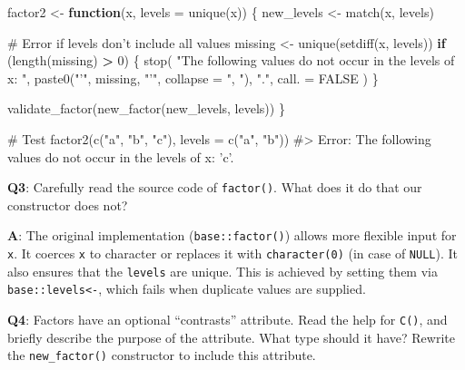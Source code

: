 \documentclass[
]{krantz}
\makeatletter
\newenvironment{Shaded}{\begin{snugshade}}{\end{snugshade}}
\newcommand{\CommentTok}[1]{\textcolor[rgb]{0.56,0.35,0.01}{\textit{#1}}}
\newcommand{\ControlFlowTok}[1]{\textcolor[rgb]{0.13,0.29,0.53}{\textbf{#1}}}
\newcommand{\DataTypeTok}[1]{\textcolor[rgb]{0.13,0.29,0.53}{#1}}
\newcommand{\DecValTok}[1]{\textcolor[rgb]{0.00,0.00,0.81}{#1}}
\newcommand{\KeywordTok}[1]{\textcolor[rgb]{0.13,0.29,0.53}{\textbf{#1}}}
\newcommand{\NormalTok}[1]{#1}
\newcommand{\OperatorTok}[1]{\textcolor[rgb]{0.81,0.36,0.00}{\textbf{#1}}}
\newcommand{\OtherTok}[1]{\textcolor[rgb]{0.56,0.35,0.01}{#1}}
\newcommand{\StringTok}[1]{\textcolor[rgb]{0.31,0.60,0.02}{#1}}
\newenvironment{kframe}{%
\medskip{}
\setlength{\fboxsep}{.8em}
 \def\at@end@of@kframe{}%
 \ifinner\ifhmode%
  \def\at@end@of@kframe{\end{minipage}}%
  \begin{minipage}{\columnwidth}%
 \fi\fi%
 \def\FrameCommand##1{\hskip\@totalleftmargin \hskip-\fboxsep
 \colorbox{shadecolor}{##1}\hskip-\fboxsep
     \hskip-\linewidth \hskip-\@totalleftmargin \hskip\columnwidth}%
 \MakeFramed {\advance\hsize-\width
   \@totalleftmargin\z@ \linewidth\hsize
   \@setminipage}}%
 {\par\unskip\endMakeFramed%
 \at@end@of@kframe}
\renewenvironment{Shaded}{\begin{kframe}}{\end{kframe}}
\renewcommand{\KeywordTok} [1]{\textcolor[rgb]{0.00,0.44,0.13}{{#1}}}
\renewcommand{\DataTypeTok}[1]{\textcolor[rgb]{0.56,0.13,0.00}{{#1}}}
\renewcommand{\DecValTok}  [1]{\textcolor[rgb]{0.25,0.63,0.44}{{#1}}}
\renewcommand{\StringTok}  [1]{\textcolor[rgb]{0.25,0.44,0.63}{{#1}}}
\renewcommand{\CommentTok} [1]{\textcolor[rgb]{0.38,0.63,0.69}{{#1}}}
\renewcommand{\OtherTok}   [1]{\textcolor[rgb]{0.00,0.44,0.13}{{#1}}}
\renewcommand{\NormalTok}  [1]{{#1}}
\makeatother
\begin{document}
\begin{Shaded}
\begin{Highlighting}[]
\NormalTok{factor2 <-}\StringTok{ }\ControlFlowTok{function}\NormalTok{(x, }\DataTypeTok{levels =} \KeywordTok{unique}\NormalTok{(x)) \{}
\NormalTok{  new_levels <-}\StringTok{ }\KeywordTok{match}\NormalTok{(x, levels)}
  
  \CommentTok{# Error if levels don't include all values}
\NormalTok{  missing <-}\StringTok{ }\KeywordTok{unique}\NormalTok{(}\KeywordTok{setdiff}\NormalTok{(x, levels))}
  \ControlFlowTok{if}\NormalTok{ (}\KeywordTok{length}\NormalTok{(missing) }\OperatorTok{>}\StringTok{ }\DecValTok{0}\NormalTok{) \{}
    \KeywordTok{stop}\NormalTok{(}
      \StringTok{"The following values do not occur in the levels of x: "}\NormalTok{,}
      \KeywordTok{paste0}\NormalTok{(}\StringTok{"'"}\NormalTok{, missing, }\StringTok{"'"}\NormalTok{, }\DataTypeTok{collapse =} \StringTok{", "}\NormalTok{), }\StringTok{"."}\NormalTok{, }
      \DataTypeTok{call. =} \OtherTok{FALSE}
\NormalTok{    )}
\NormalTok{  \}}
  
  \KeywordTok{validate_factor}\NormalTok{(}\KeywordTok{new_factor}\NormalTok{(new_levels, levels))}
\NormalTok{\}}

\CommentTok{# Test}
\KeywordTok{factor2}\NormalTok{(}\KeywordTok{c}\NormalTok{(}\StringTok{"a"}\NormalTok{, }\StringTok{"b"}\NormalTok{, }\StringTok{"c"}\NormalTok{), }\DataTypeTok{levels =} \KeywordTok{c}\NormalTok{(}\StringTok{"a"}\NormalTok{, }\StringTok{"b"}\NormalTok{))}
\CommentTok{#> Error: The following values do not occur in the levels of x: 'c'.}
\end{Highlighting}
\end{Shaded}

\textbf{{Q3}}: Carefully read the source code of \texttt{factor()}. What does it do that our constructor does not?

\textbf{{A}}: The original implementation (\texttt{base::factor()}) allows more flexible input for \texttt{x}. It coerces \texttt{x} to character or replaces it with \texttt{character(0)} (in case of \texttt{NULL}). It also ensures that the \texttt{levels} are unique. This is achieved by setting them via \texttt{base::levels\textless{}-}, which fails when duplicate values are supplied.

\textbf{{Q4}}: Factors have an optional ``contrasts'' attribute. Read the help for \texttt{C()}, and briefly describe the purpose of the attribute. What type should it have? Rewrite the \texttt{new\_factor()} constructor to include this attribute.
\end{document}
